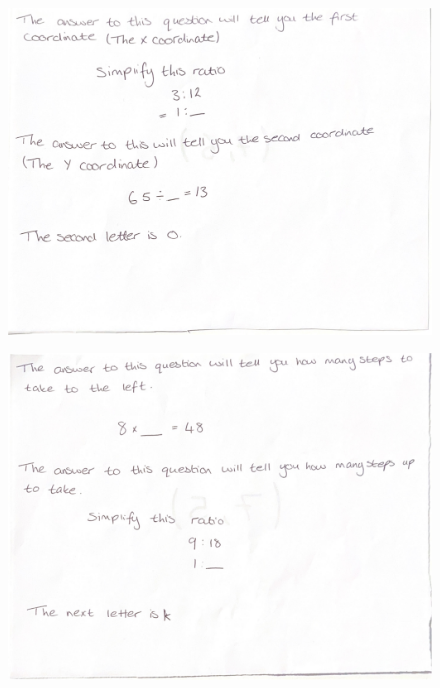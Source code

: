 \documentclass[11pt, a4paper, notitlepage]{article}
\begin{document}
\begin{figure}[htbp]
    \centering
    \includegraphics[width=\textwidth]{Images/CoordinateGrid_questions-pages-5.pdf}
\end{figure}
\begin{figure}[htbp]
    \centering
    \includegraphics[width=\textwidth]{Images/CoordinateGrid_questions-pages-6.pdf}
\end{figure}
\end{document}
